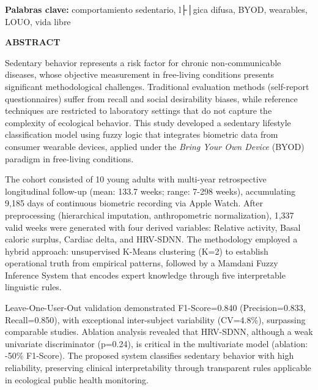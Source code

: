 \documentclass[12pt,letterpaper,oneside]{report}
\begin{document}
\vspace{0.5cm}
\noindent\textbf{Palabras clave:} comportamiento sedentario, l├│gica difusa, BYOD, wearables, LOUO, vida libre

\newpage
\thispagestyle{empty}

{\centering
{\fontsize{14}{16}\selectfont\bfseries ABSTRACT}\\[1cm]
}

\setlength{\parindent}{1.27cm}
\onehalfspacing
\setlength{\parskip}{6pt plus 2pt minus 1pt}

\noindent Sedentary behavior represents a risk factor for chronic non-communicable diseases, whose objective measurement in free-living conditions presents significant methodological challenges. Traditional evaluation methods (self-report questionnaires) suffer from recall and social desirability biases, while reference techniques are restricted to laboratory settings that do not capture the complexity of ecological behavior. This study developed a sedentary lifestyle classification model using fuzzy logic that integrates biometric data from consumer wearable devices, applied under the \textit{Bring Your Own Device} (BYOD) paradigm in free-living conditions.

The cohort consisted of 10 young adults with multi-year retrospective longitudinal follow-up (mean: 133.7 weeks; range: 7-298 weeks), accumulating 9,185 days of continuous biometric recording via Apple Watch. After preprocessing (hierarchical imputation, anthropometric normalization), 1,337 valid weeks were generated with four derived variables: Relative activity, Basal caloric surplus, Cardiac delta, and HRV-SDNN. The methodology employed a hybrid approach: unsupervised K-Means clustering (K=2) to establish operational truth from empirical patterns, followed by a Mamdani Fuzzy Inference System that encodes expert knowledge through five interpretable linguistic rules.

Leave-One-User-Out validation demonstrated F1-Score=0.840 (Precision=0.833, Recall=0.850), with exceptional inter-subject variability (CV=4.8\%), surpassing comparable studies. Ablation analysis revealed that HRV-SDNN, although a weak univariate discriminator (p=0.24), is critical in the multivariate model (ablation: -50\% F1-Score). The proposed system classifies sedentary behavior with high reliability, preserving clinical interpretability through transparent rules applicable in ecological public health monitoring.
\end{document}
